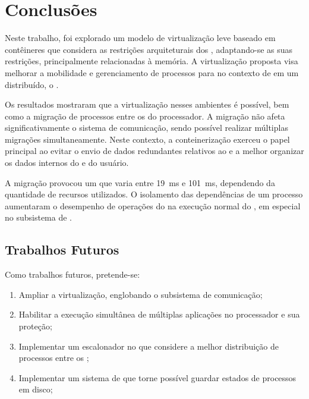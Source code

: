 \glsresetall
\chapter{Conclusões}
\label{chap.conclusions}

Neste trabalho, foi explorado um modelo de virtualização leve baseado em contêineres que considera as restrições arquiteturais dos \lws, adaptando-se as suas restrições, principalmente relacionadas à memória. A virtualização proposta visa melhorar a mobilidade e gerenciamento de processos para \lws no contexto de em um \os distribuído, o \nanvix.
%

Os resultados mostraram que a virtualização nesses ambientes é possível, bem como a migração de processos entre os \clusters do processador. A migração não afeta significativamente o sistema de comunicação, sendo possível realizar múltiplas migrações simultaneamente. Neste contexto, a conteinerização exerceu o papel principal ao evitar o envio de dados redundantes relativos ao  e a melhor organizar os dados internos do  e do usuário. 

A migração provocou um \downtime que varia entre 19~ms e 101~ms, dependendo da quantidade de recursos utilizados. O isolamento das dependências de um processo aumentaram o desempenho de operações do  na execução normal do \so, em especial no subsistema de \threads.

\section{Trabalhos Futuros}
Como trabalhos futuros, pretende-se:

\begin{enumerate}[label=(\roman*)]
    \item Ampliar a virtualização, englobando o subsistema de comunicação;
    \item Habilitar a execução simultânea de múltiplas aplicações no processador e sua proteção;
    \item Implementar um escalonador no \nanvix que considere a melhor distribuição de processos entre os \clusters;
    \item Implementar um sistema de \checkpointing que torne possível guardar estados de processos em disco;
\end{enumerate}

